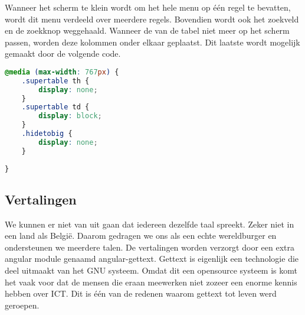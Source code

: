 \documentclass[a4paper,11pt]{article}
\begin{document}
Wanneer het scherm te klein wordt om het hele menu op één regel te bevatten, wordt dit menu verdeeld over meerdere regels. Bovendien wordt ook het zoekveld en de zoekknop weggehaald. Wanneer de van de tabel niet meer op het scherm passen, worden deze kolommen onder elkaar geplaatst. Dit laatste wordt mogelijk gemaakt door de volgende code.

\begin{lstlisting}[language=css]
@media (max-width: 767px) {
	.supertable th {
		display: none;
	}
	.supertable td {
		display: block;
	}
	.hidetobig {
		display: none;
	}
	
}

\end{lstlisting}

\subsection{Vertalingen}
We kunnen er niet van uit gaan dat iedereen dezelfde taal spreekt. Zeker niet in een land als België. Daarom gedragen we ons als een echte wereldburger en ondersteunen we meerdere talen. De vertalingen worden verzorgt door een extra angular module genaamd angular-gettext. Gettext is eigenlijk een technologie die deel uitmaakt van het GNU systeem. Omdat dit een opensource systeem is komt het vaak voor dat de mensen die eraan meewerken niet zozeer een enorme kennis hebben over ICT. Dit is één van de redenen waarom gettext tot leven werd geroepen.
\end{document}
